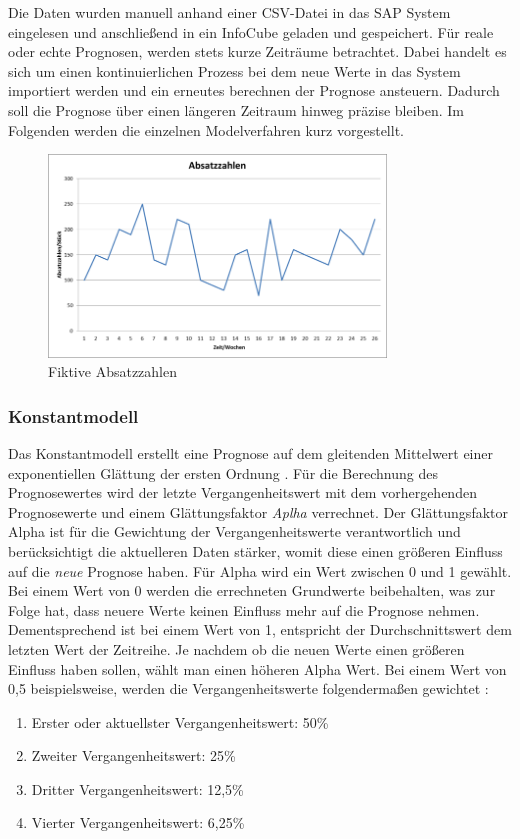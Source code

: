 Die Daten wurden manuell anhand einer CSV-Datei in das SAP System eingelesen und anschließend in ein InfoCube geladen und gespeichert. Für reale oder echte Prognosen, werden stets kurze Zeiträume betrachtet. Dabei handelt es sich um einen kontinuierlichen Prozess bei dem neue Werte in das System importiert werden und ein erneutes berechnen der Prognose ansteuern. Dadurch soll die Prognose über einen längeren Zeitraum hinweg präzise bleiben. Im Folgenden werden die einzelnen Modelverfahren kurz vorgestellt.
\begin{figure}[h]
	\centering
	\includegraphics[width=0.8\textwidth]{../pics/absatzzahlen_nko}
	\caption{Fiktive Absatzzahlen}
	\label{fig:absatzzahlen}
\end{figure}
\subsubsection{Konstantmodell}
Das Konstantmodell erstellt eine Prognose auf dem gleitenden Mittelwert einer exponentiellen Glättung der ersten Ordnung \cite[ Abschnitt 4, Seite 14]{scm:script_17_1}. Für die Berechnung des Prognosewertes wird der letzte Vergangenheitswert mit dem vorhergehenden Prognosewerte und einem Glättungsfaktor \textit{Aplha} verrechnet. Der Glättungsfaktor Alpha ist für die Gewichtung der Vergangenheitswerte verantwortlich und berücksichtigt die aktuelleren Daten stärker, womit diese einen größeren Einfluss auf die \textit{neue} Prognose haben. 
Für Alpha wird ein Wert zwischen 0 und 1 gewählt. Bei einem Wert von 0 werden die errechneten Grundwerte beibehalten, was zur Folge hat, dass neuere Werte keinen Einfluss mehr auf die Prognose nehmen. Dementsprechend ist bei einem Wert von 1, entspricht der Durchschnittswert dem letzten Wert der Zeitreihe. Je nachdem ob die neuen Werte einen größeren Einfluss haben sollen, wählt man einen höheren Alpha Wert. Bei einem Wert von 0,5 beispielsweise, werden die Vergangenheitswerte folgendermaßen gewichtet \cite{scm:constmodel_3}:
\begin{enumerate}
	\item Erster oder aktuellster Vergangenheitswert: 50\%
	\item Zweiter Vergangenheitswert: 25\%
	\item Dritter Vergangenheitswert: 12,5\%
	\item Vierter Vergangenheitswert: 6,25\%
\end{enumerate}

